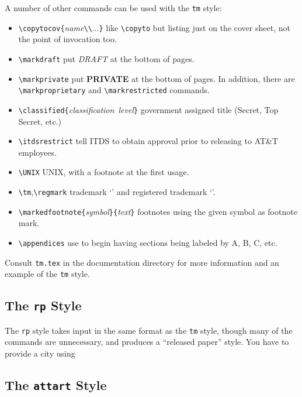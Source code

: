 A number of other commands can be used with the {\tt tm} style:

\begin{itemize}
\item[] \hbox{\verb|\copytocov{|{\em name}\verb|\\|...\verb|}|}
	like \verb|\copyto| but listing just on the cover sheet,
	not the point of invocation too.
\item[] \hbox{\verb|\markdraft|}
	put {\em DRAFT\/} at the bottom of pages.
\item[] \hbox{\verb|\markprivate|}
	put {\bf PRIVATE} at the bottom of pages.
	In addition, there are \verb|\markproprietary|
	and \verb|\markrestricted| commands.
\item[] \hbox{\verb|\classified{|{\em classification level}\verb|}|}
	government assigned title (Secret, Top Secret, etc.)
\item[] \hbox{\verb|\itdsrestrict|}
	tell ITDS to obtain approval prior to releasing to
	AT\&T employees.
\item[] \hbox{\verb|\UNIX|}
	UNIX\regmark, with a footnote at the first usage.
\item[] \hbox{\verb|\tm|,\verb|\regmark|}
	trademark `\tm' and registered trademark `\regmark'.
\item[] \hbox{\verb|\markedfootnote{|{\em symbol}\verb|}{|{\em text}\verb|}|}
	footnotes using the given symbol as footnote mark.
\item[] \hbox{\verb|\appendices|}
	use to begin having sections being labeled by A, B, C, etc.
\end{itemize}

Consult \verb|tm.tex| in the documentation directory for more
information and an example of the {\tt tm} style.

\subsection{The {\tt rp} Style}

The {\tt rp} style takes input in the same format as the {\tt tm}
style, though many of the commands are unnecessary, and produces
a ``released paper'' style.
You have to provide a city using
\begin{eg}
\end{eg}

\subsection{The {\tt attart} Style}

